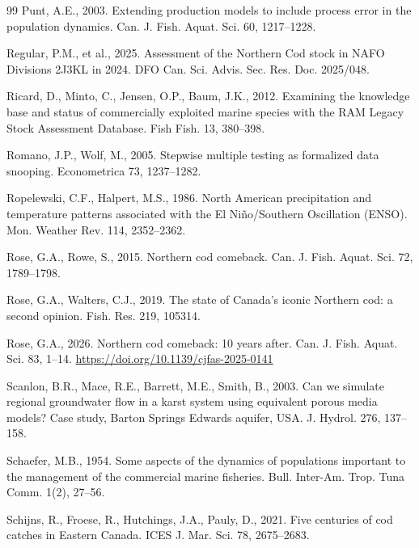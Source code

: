 \begin{thebibliography}{99}
Punt, A.E., 2003. Extending production models to include process error in the population dynamics. Can. J. Fish. Aquat. Sci. 60, 1217--1228.

Regular, P.M., et al., 2025. Assessment of the Northern Cod stock in NAFO Divisions 2J3KL in 2024. DFO Can. Sci. Advis. Sec. Res. Doc. 2025/048.

Ricard, D., Minto, C., Jensen, O.P., Baum, J.K., 2012. Examining the knowledge base and status of commercially exploited marine species with the RAM Legacy Stock Assessment Database. Fish Fish. 13, 380--398.

Romano, J.P., Wolf, M., 2005. Stepwise multiple testing as formalized data snooping. Econometrica 73, 1237--1282.

Ropelewski, C.F., Halpert, M.S., 1986. North American precipitation and temperature patterns associated with the El Ni{\~n}o/Southern Oscillation (ENSO). Mon. Weather Rev. 114, 2352--2362.

Rose, G.A., Rowe, S., 2015. Northern cod comeback. Can. J. Fish. Aquat. Sci. 72, 1789--1798.

Rose, G.A., Walters, C.J., 2019. The state of Canada's iconic Northern cod: a second opinion. Fish. Res. 219, 105314.

Rose, G.A., 2026. Northern cod comeback: 10 years after. Can. J. Fish. Aquat. Sci. 83, 1--14. \url{https://doi.org/10.1139/cjfas-2025-0141}

Scanlon, B.R., Mace, R.E., Barrett, M.E., Smith, B., 2003. Can we simulate regional groundwater flow in a karst system using equivalent porous media models? Case study, Barton Springs Edwards aquifer, USA. J. Hydrol. 276, 137--158.

Schaefer, M.B., 1954. Some aspects of the dynamics of populations important to the management of the commercial marine fisheries. Bull. Inter-Am. Trop. Tuna Comm. 1(2), 27--56.

Schijns, R., Froese, R., Hutchings, J.A., Pauly, D., 2021. Five centuries of cod catches in Eastern Canada. ICES J. Mar. Sci. 78, 2675--2683.


\end{thebibliography}
